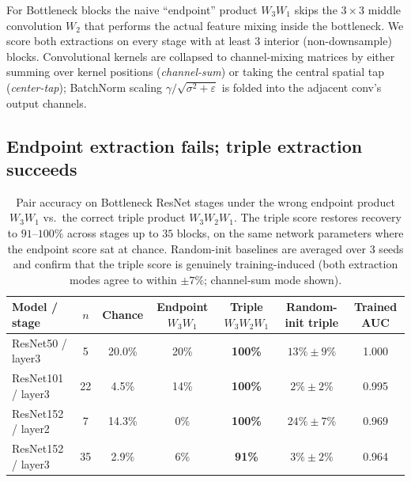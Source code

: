 \documentclass[10pt]{article}
\theoremstyle{remark}
\begin{document}
For Bottleneck blocks the naive ``endpoint'' product $W_3 W_1$ skips the
$3{\times}3$ middle convolution $W_2$ that performs the actual feature
mixing inside the bottleneck. We score both extractions on every stage
with at least 3 interior (non-downsample) blocks. Convolutional kernels
are collapsed to channel-mixing matrices by either summing over kernel
positions (\emph{channel-sum}) or taking the central spatial tap
(\emph{center-tap}); BatchNorm scaling $\gamma/\sqrt{\sigma^2+\varepsilon}$
is folded into the adjacent conv's output channels.

\subsection{Endpoint extraction fails; triple extraction succeeds}

\begin{table}[H]
\centering
\small
\renewcommand{\arraystretch}{1.15}
\begin{tabular}{lcccccc}
\toprule
Model / stage & $n$ & Chance
  & Endpoint $W_3 W_1$
  & \textbf{Triple $W_3 W_2 W_1$}
  & Random-init triple
  & Trained AUC \\
\midrule
ResNet50 / layer3   &  5 & 20.0\% & 20\% & \textbf{100\%} & $13\%\pm9\%$  & 1.000 \\
ResNet101 / layer3  & 22 &  4.5\% & 14\% & \textbf{100\%} & $2\%\pm2\%$   & 0.995 \\
ResNet152 / layer2  &  7 & 14.3\% &  0\% & \textbf{100\%} & $24\%\pm7\%$  & 0.969 \\
ResNet152 / layer3  & 35 &  2.9\% &  6\% & \textbf{91\%}  & $3\%\pm2\%$   & 0.964 \\
\bottomrule
\end{tabular}
\caption{Pair accuracy on Bottleneck ResNet stages under the wrong
endpoint product $W_3 W_1$ vs.\ the correct triple product
$W_3 W_2 W_1$. The triple score restores recovery to $91$--$100\%$
across stages up to $35$ blocks, on the same network parameters where
the endpoint score sat at chance. Random-init baselines are averaged
over 3 seeds and confirm that the triple score is genuinely training-induced
(both extraction modes agree to within $\pm 7\%$; channel-sum mode shown).}
\label{tab:factorization-results}
\end{table}
\end{document}

